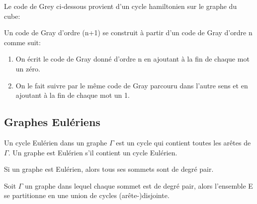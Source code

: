 \begin{exmp}
Le code de Grey ci-dessous provient d'un cycle hamiltonien sur le graphe du cube:
\end{exmp}

\begin{figure}[!tbph]
  \centering
  \begin{minipage}[b]{0.4\textwidth}
    
  \end{minipage}
  \hfill
  \begin{minipage}[b]{0.4\textwidth}
    
  \end{minipage}
\end{figure}

Un code de Gray d'ordre (n+1) se construit à partir d'un code de Gray d'ordre n comme suit:

\begin{enumerate}
	\item On écrit le code de Gray donné d'ordre n en ajoutant à la fin de chaque mot un zéro.
	\item On le fait suivre par le même code de Gray parcouru dans l'autre sens et en ajoutant à la fin de chaque mot un 1.
\end{enumerate}


\subsection{Graphes Eulériens}

\begin{defn}
Un cycle Eulérien dans un graphe $\Gamma$ est un cycle qui contient toutes les arêtes de $\Gamma$.
Un graphe est Eulérien s'il contient un cycle Eulérien.
\end{defn}

\begin{prop}
Si un graphe est Eulérien, alors tous ses sommets sont de degré pair.
\end{prop}

\begin{lemme}
Soit $\Gamma$ un graphe dans lequel chaque sommet est de degré pair, alors l'ensemble E se partitionne en une union de cycles (arête-)disjointe.
\end{lemme}

\begin{exmp}

\end{exmp}


